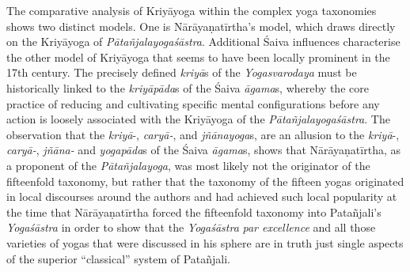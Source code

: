 The comparative analysis of Kriyāyoga within the complex yoga taxonomies shows two distinct models. One is Nārāyaṇatīrtha's model, which draws directly on the Kriyāyoga of \textit{Pātañjalayogaśāstra}. Additional Śaiva influences characterise the other model of Kriyāyoga that seems to have been locally prominent in the 17th century. The precisely defined \textit{kriyā}s of the \textit{Yogasvarodaya} must be historically linked to the \textit{kriyāpāda}s of the Śaiva \textit{āgama}s, whereby the core practice of reducing and cultivating specific mental configurations before any action is loosely associated with the Kriyāyoga of the \textit{Pātañjalayogaśāstra}. The observation that the \textit{kriyā}-, \textit{caryā-}, and \textit{jñānayoga}s, are an allusion to the \textit{kriyā}-, \textit{caryā-}, \textit{jñāna-} and \textit{yogapāda}s of the Śaiva \textit{āgama}s, shows that Nārāyaṇatīrtha, as a proponent of the \textit{Pātañjalayoga}, was most likely not the originator of the fifteenfold taxonomy, but rather that the taxonomy of the fifteen yogas originated in local discourses around the authors and had achieved such local popularity at the time that Nārāyaṇatīrtha forced the fifteenfold taxonomy into Patañjali's \textit{Yogaśāstra} in order to show that the \textit{Yogaśāstra} \textit{par excellence} and all those varieties of yogas that were discussed in his sphere are in truth just single aspects of the superior ``classical'' system of Patañjali.

